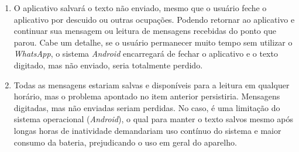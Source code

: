 \documentclass[
	article,			%
	11pt,				%
	oneside,			%
	a4paper,			%
	english,			%
	brazil,				%
	sumario=tradicional
	]{abntex2}
\begin{document}
\begin{enumerate}
	\item O aplicativo salvará o texto não enviado, mesmo que o usuário feche o aplicativo por descuido ou outras ocupações. Podendo retornar ao aplicativo e continuar sua mensagem ou leitura de mensagens recebidas do ponto que parou. Cabe um detalhe, se o usuário permanecer muito tempo sem utilizar o \textit{WhatsApp}, o sistema \textit{Android} encarregará de fechar o aplicativo e o texto digitado, mas não enviado, seria totalmente perdido.
	
	\item Todas as mensagens estariam salvas e disponíveis para a leitura em qualquer horário, mas o problema apontado no item anterior persistiria. Mensagens digitadas, mas não enviadas seriam perdidas. No caso, é uma limitação do sistema operacional (\textit{Android}), o qual para manter o texto salvos mesmo após longas horas de inatividade demandariam uso contínuo do sistema e maior consumo da bateria, prejudicando o uso em geral do aparelho.
\end{enumerate}


\end{document}
